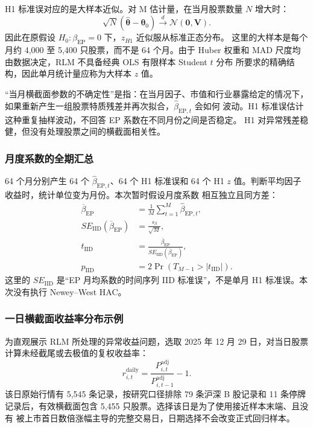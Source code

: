 \documentclass[UTF8,a4paper,11pt]{ctexart}
\begin{document}
H1 标准误对应的是大样本近似。对 M 估计量，在当月股票数量 $N$ 增大时：
\begin{equation}
  \sqrt{N}
  (\widehat{\bm{\theta}}-\bm{\theta}_0)
  \xrightarrow{d}\mathcal{N}(\bm{0},\bm{V}).
\end{equation}
因此在原假设 $H_0:\beta_{\mathrm{EP}}=0$ 下，$z_{H1}$ 近似服从标准正态分布。
这里的大样本是每个月约 4,000 至 5,400 只股票，而不是 64 个月。由于 Huber
权重和 MAD 尺度均由数据决定，RLM 不具备经典 OLS 有限样本 Student $t$ 分布
所要求的精确结构，因此单月统计量应称为大样本 $z$ 值。

“当月横截面参数的不确定性”是指：在当月因子、市值和行业暴露给定的情况下，
如果重新产生一组股票特质残差并再次拟合，$\widehat\beta_{\mathrm{EP},t}$ 会如何
波动。H1 标准误估计这种重复抽样波动，不回答 EP 系数在不同月份之间是否稳定。
H1 对异常残差稳健，但没有处理股票之间的横截面相关性。

\subsubsection{月度系数的全期汇总}

64 个月分别产生 64 个 $\widehat\beta_{\mathrm{EP},t}$、64 个 H1 标准误和
64 个 H1 $z$ 值。判断平均因子收益时，统计单位变为月份。本次暂时假设月度系数
相互独立且同方差：
\begin{align}
  \overline\beta_{\mathrm{EP}}
  &=\frac{1}{M}\sum_{t=1}^{M}\widehat\beta_{\mathrm{EP},t},\\
  SE_{\mathrm{IID}}(\overline\beta_{\mathrm{EP}})
  &=\frac{s_{\beta}}{\sqrt{M}},\\
  t_{\mathrm{IID}}
  &=\frac{\overline\beta_{\mathrm{EP}}}
  {SE_{\mathrm{IID}}(\overline\beta_{\mathrm{EP}})},\\
  p_{\mathrm{IID}}
  &=2\Pr\!\left(T_{M-1}>|t_{\mathrm{IID}}|\right).
\end{align}
这里的 $SE_{\mathrm{IID}}$ 是“EP 月均系数的时间序列 IID 标准误”，不是单月
H1 标准误。本次没有执行 Newey--West HAC。

\subsubsection{一日横截面收益率分布示例}

为直观展示 RLM 所处理的异常收益问题，选取 2025 年 12 月 29 日，对当日股票
计算未经截尾或去极值的复权收益率：
\begin{equation}
  r^{\mathrm{daily}}_{i,t}
  =\frac{P^{\mathrm{adj}}_{i,t}}
  {P^{\mathrm{adj}}_{i,t-1}}-1.
\end{equation}
该日原始行情有 5,545 条记录，按研究口径排除 79 条沪深 B 股记录和 11 条停牌
记录后，有效横截面包含 5,455 只股票。选择该日是为了使用接近样本末端、且没有
被上市首日数倍涨幅主导的完整交易日，日期选择不会改变正式回归样本。
\end{document}
